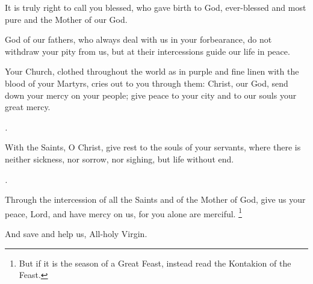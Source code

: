 

\creed


It is truly right to call you blessed, who gave birth to God,
ever-blessed and most pure and the Mother of our God.
\greaterinhonour


\trisagion


God of our fathers, who always deal with us in your forbearance,
do not withdraw your pity from us, but at their intercessions guide our life in peace.

Your Church, clothed throughout the world as in purple and fine linen with the blood of your Martyrs,
cries out to you through them: Christ, our God, send down your mercy on your people;
give peace to your city and to our souls your great mercy.

\textit{\glory.}

With the Saints, O Christ, give rest to the souls of your servants,
where there is neither sickness, nor sorrow, nor sighing, but life without end.

\textit{\bothnow.}

Through the intercession of all the Saints and of the Mother of God,
give us your peace, Lord, and have mercy on us, for you alone are merciful.
\footnote{But if it is the season of a Great Feast, instead read the Kontakion of the Feast.}



\hours


\glorybothnow

\greaterinhonour

\throughtheprayers


And save and help us, All-holy Virgin.


